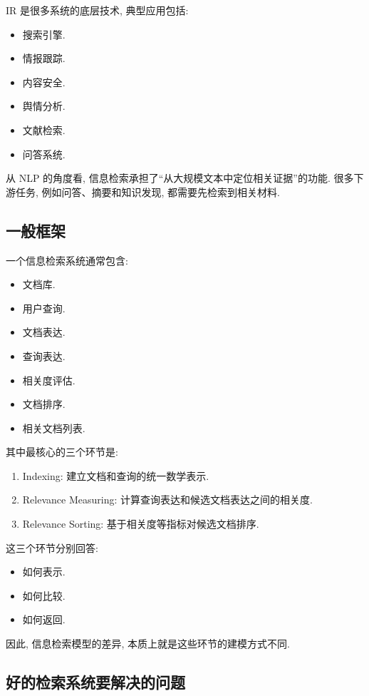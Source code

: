 IR 是很多系统的底层技术, 典型应用包括:

\begin{itemize}
\item 搜索引擎.
\item 情报跟踪.
\item 内容安全.
\item 舆情分析.
\item 文献检索.
\item 问答系统.
\end{itemize}

从 NLP 的角度看, 信息检索承担了“从大规模文本中定位相关证据”的功能.
很多下游任务, 例如问答、摘要和知识发现, 都需要先检索到相关材料.

\subsection{一般框架}


一个信息检索系统通常包含:

\begin{itemize}
\item 文档库.
\item 用户查询.
\item 文档表达.
\item 查询表达.
\item 相关度评估.
\item 文档排序.
\item 相关文档列表.
\end{itemize}

其中最核心的三个环节是:

\begin{enumerate}
\item[1.] Indexing: 建立文档和查询的统一数学表示.
\item[2.] Relevance Measuring: 计算查询表达和候选文档表达之间的相关度.
\item[3.] Relevance Sorting: 基于相关度等指标对候选文档排序.
\end{enumerate}

这三个环节分别回答:

\begin{itemize}
\item 如何表示.
\item 如何比较.
\item 如何返回.
\end{itemize}

因此, 信息检索模型的差异, 本质上就是这些环节的建模方式不同.

\subsection{好的检索系统要解决的问题}


